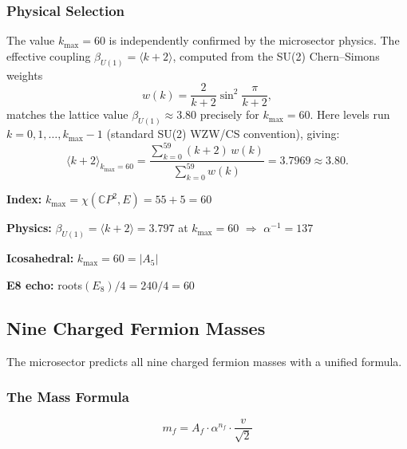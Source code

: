 \subsubsection{Physical Selection}

The value $k_{\max} = 60$ is independently confirmed by the microsector physics. The effective coupling $\beta_{U(1)} = \langle k + 2 \rangle$, computed from the SU(2) Chern--Simons weights 
\begin{equation}
w(k) = \frac{2}{k+2}\sin^2\frac{\pi}{k+2},
\end{equation}
matches the lattice value $\beta_{U(1)} \approx 3.80$ precisely for $k_{\max} = 60$. Here levels run $k = 0, 1, \ldots, k_{\max} - 1$ (standard SU(2) WZW/CS convention), giving:
\begin{equation}
\langle k + 2 \rangle_{k_{\max}=60} = \frac{\sum_{k=0}^{59} (k+2)\, w(k)}{\sum_{k=0}^{59} w(k)} = 3.7969 \approx 3.80.
\end{equation}

\begin{tcolorbox}[colback=blue!5!white, colframe=blue!60!black, title=Bridge Lemma (Final Form)]
\textbf{Index:} $k_{\max} = \chi(\mathbb{C}P^2, E) = 55 + 5 = 60$ 

\textbf{Physics:} $\beta_{U(1)} = \langle k+2 \rangle = 3.797$ at $k_{\max} = 60$ $\Rightarrow$ $\alpha^{-1} = 137$

\textbf{Icosahedral:} $k_{\max} = 60 = |A_5|$ 

\textbf{E8 echo:} roots$(E_8)/4 = 240/4 = 60$ \checkmark
\end{tcolorbox}

\subsection{Nine Charged Fermion Masses}\label{sec:fermion-masses}

The microsector predicts all nine charged fermion masses with a unified formula.

\subsubsection{The Mass Formula}

\begin{equation}
\boxed{m_f = A_f \cdot \alpha^{n_f} \cdot \frac{v}{\sqrt{2}}}
\end{equation}

